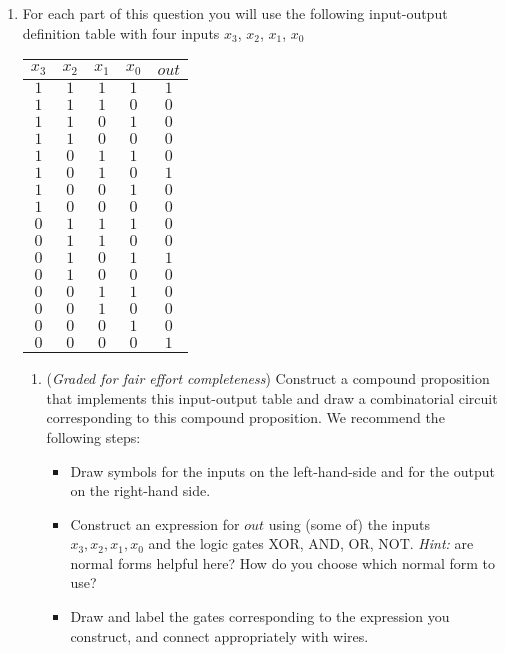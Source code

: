 \documentclass[12pt, oneside]{article}
\begin{document}
\begin{enumerate}
\begin{enumerate}
   {\it Bonus; not for credit (do not hand in)}: How would you translate each of the equivalent compound
   propositions in English? Does doing so help illustrate why they are equivalent?
   \end{enumerate}
   
   \item For each part of this question you will use the following input-output definition table 
   with four inputs $x_3$, $x_2$, $x_1$, $x_0$
   
   \begin{center}
   \begin{tabular}{cccc|c}
   $x_3$ & $x_2$ & $x_1$ & $x_0$ & $out$\\
   \hline
   $1$ & $1$ & $1$ & $1$ & $1$\\
   $1$ & $1$ & $1$ & $0$ & $0$\\
   $1$ & $1$ & $0$ & $1$ & $0$\\
   $1$ & $1$ & $0$ & $0$ & $0$\\
   $1$ & $0$ & $1$ & $1$ & $0$\\
   $1$ & $0$ & $1$ & $0$ & $1$\\
   $1$ & $0$ & $0$ & $1$ & $0$\\
   $1$ & $0$ & $0$ & $0$ & $0$\\
   $0$ & $1$ & $1$ & $1$ & $0$\\
   $0$ & $1$ & $1$ & $0$ & $0$\\
   $0$ & $1$ & $0$ & $1$ & $1$\\
   $0$ & $1$ & $0$ & $0$ & $0$\\
   $0$ & $0$ & $1$ & $1$ & $0$\\
   $0$ & $0$ & $1$ & $0$ & $0$\\
   $0$ & $0$ & $0$ & $1$ & $0$\\
   $0$ & $0$ & $0$ & $0$ & $1$\\
   \end{tabular}
   \end{center}
   \begin{enumerate}   
   \item  ({\it Graded for fair effort completeness}) 
   Construct a compound proposition that implements this input-output table
   and draw a combinatorial circuit corresponding to this compound proposition. We recommend
   the following steps:
   
   \begin{itemize}
   \item Draw symbols for the inputs on the left-hand-side and for the output on the right-hand side.
   \item Construct an expression for $out$ using (some of) the inputs 
   $x_3, x_2, x_1, x_0$ and the logic gates XOR, AND, OR, NOT. {\it Hint:} are normal forms helpful here?
   How do you choose which normal form to use?
   \item Draw and label the gates corresponding to the expression you construct, and connect appropriately with wires.
   \end{itemize}
   

\end{enumerate}
\end{enumerate}
\end{document}
